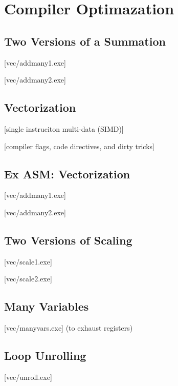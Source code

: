 \documentclass[main]{subfiles}
\begin{document}
\section{Compiler Optimazation}
\subsection{Two Versions of a Summation}
[vec/addmany1.exe]

[vec/addmany2.exe]
\subsection{Vectorization}
[single instruciton multi-data (SIMD)]

[compiler flags, code directives, and dirty tricks]
\subsection{Ex ASM: Vectorization}
[vec/addmany1.exe]

[vec/addmany2.exe]
\subsection{Two Versions of Scaling}
[vec/scale1.exe]

[vec/scale2.exe]

\subsection{Many Variables}
[vec/manyvars.exe] (to exhaust registers)

\subsection{Loop Unrolling}
[vec/unroll.exe]
\end{document}
